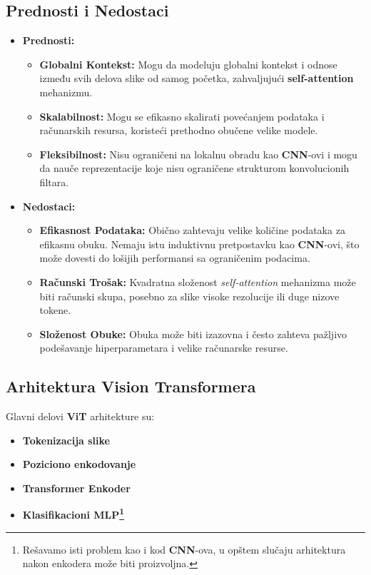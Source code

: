 \documentclass[12pt]{article}
\begin{document}
   \subsection{Prednosti i Nedostaci}
   \begin{itemize}
      \item \textbf{Prednosti:}
      \begin{itemize}
          \item \textbf{Globalni Kontekst:} Mogu da modeluju globalni kontekst 
          i odnose između svih delova slike od samog početka, zahvaljujući \textbf{self-attention} 
          mehanizmu.
          \item \textbf{Skalabilnost:} Mogu se efikasno skalirati povećanjem podataka i računarskih 
          resursa, koristeći prethodno obučene velike modele.
          \item \textbf{Fleksibilnost:} Nisu ograničeni na lokalnu obradu kao \textbf{CNN}-ovi i 
          mogu da nauče reprezentacije koje nisu ograničene strukturom konvolucionih filtara.
      \end{itemize}
      \item \textbf{Nedostaci:}
      \begin{itemize}
         \item \textbf{Efikasnost Podataka:} Obično zahtevaju velike količine 
         podataka za efikasnu obuku. Nemaju istu induktivnu pretpostavku kao \textbf{CNN}-ovi, 
         što može dovesti do lošijih performansi sa ograničenim podacima.
         \item \textbf{Računski Trošak:} Kvadratna složenost \textit{self-attention} mehanizma 
         može biti računski skupa, posebno za slike visoke rezolucije ili duge nizove tokene.
         \item \textbf{Složenost Obuke:} Obuka može biti izazovna i često zahteva pažljivo 
         podešavanje hiperparametara i velike računarske resurse.
      \end{itemize}
  \end{itemize}

  \newpage
  \subsection{Arhitektura Vision Transformera}
  Glavni delovi \textbf{ViT} arhitekture su:
   \begin{itemize}
         \item \textbf{Tokenizacija slike}
         \item \textbf{Poziciono enkodovanje}
         \item \textbf{Transformer Enkoder}
         \item \textbf{Klasifikacioni MLP\footnote{Rešavamo isti problem kao i kod \textbf{CNN}-ova, u opštem slučaju arhitektura nakon enkodera može biti proizvoljna.}}
   \end{itemize}
\end{document}
